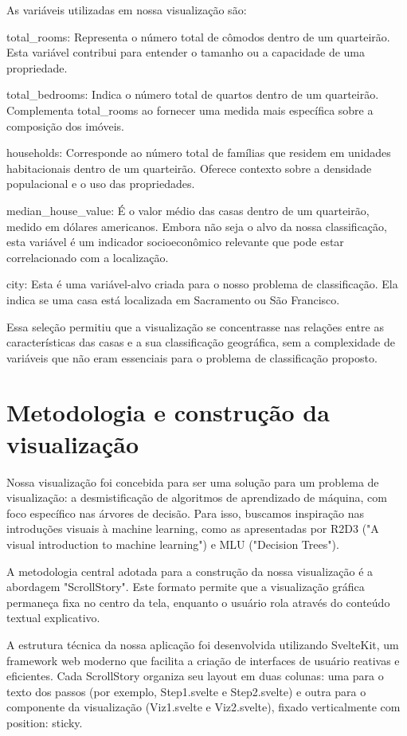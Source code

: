 \documentclass{article}
\begin{document}
As variáveis utilizadas em nossa visualização são:
\item total_rooms: Representa o número total de cômodos dentro de um quarteirão. 
Esta variável contribui para entender o tamanho ou a capacidade de uma propriedade.
\item total_bedrooms: Indica o número total de quartos dentro de um quarteirão. 
Complementa total_rooms ao fornecer uma medida mais específica sobre a composição dos imóveis.
\item households: Corresponde ao número total de famílias que residem em unidades habitacionais dentro de um quarteirão. 
Oferece contexto sobre a densidade populacional e o uso das propriedades.
\item median_house_value: É o valor médio das casas dentro de um quarteirão, medido em dólares americanos. 
Embora não seja o alvo da nossa classificação, esta variável é um indicador socioeconômico relevante 
que pode estar correlacionado com a localização.
\item city: Esta é uma variável-alvo criada para o nosso problema de classificação. Ela indica se uma casa está localizada 
em Sacramento ou São Francisco.

Essa seleção permitiu que a visualização se concentrasse nas relações entre as características 
das casas e a sua classificação geográfica, sem a complexidade de variáveis que não eram essenciais 
para o problema de classificação proposto.

\section{Metodologia e construção da visualização}

Nossa visualização foi concebida para ser uma solução para um problema de visualização: 
a desmistificação de algoritmos de aprendizado de máquina, com foco específico nas árvores de decisão. 
Para isso, buscamos inspiração nas introduções visuais à machine learning, como as apresentadas por 
R2D3 ("A visual introduction to machine learning") e MLU ("Decision Trees"). 

A metodologia central adotada para a construção da nossa visualização é a abordagem "ScrollStory". Este 
formato permite que a visualização gráfica permaneça fixa no centro da tela, enquanto o usuário rola através 
do conteúdo textual explicativo.

A estrutura técnica da nossa aplicação foi desenvolvida utilizando SvelteKit, um framework web moderno 
que facilita a criação de interfaces de usuário reativas e eficientes. Cada ScrollStory organiza seu 
layout em duas colunas: uma para o texto dos passos (por exemplo, Step1.svelte e Step2.svelte) e outra 
para o componente da visualização (Viz1.svelte e Viz2.svelte), fixado verticalmente com position: sticky. 
\end{document}
